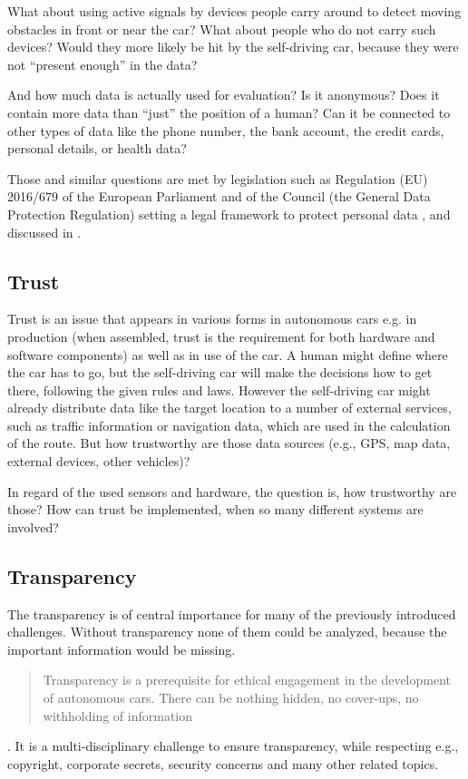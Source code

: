 What about using active signals by devices people carry around to detect moving obstacles in front or near the car? What about people who do not carry such devices? Would they more likely be hit by the self-driving car, because they were not \enquote{present enough} in the data?

And how much data is actually used for evaluation? Is it anonymous? Does it contain more data than \enquote{just} the position of a human? Can it be connected to other types of data like the phone number, the bank account, the credit cards, personal details, or health data?

Those and similar questions are met by legislation such as Regulation (EU) 2016/679 of the European Parliament and of the Council (the General Data Protection Regulation) setting a legal framework to protect personal data \cite{EuropeanUnion2016}, and discussed in \cite{doi:10.1093/idpl/ipx005}.


\subsection{Trust}
\label{sec:EAofTC:Trust}

Trust is an issue that appears in various forms in autonomous cars e.g. in production (when assembled, trust is the requirement for both hardware and software components) as well as in use of the car. A human might define where the car has to go, but the self-driving car will make the decisions how to get there, following the given rules and laws. However the self-driving car might already distribute data like the target location to a number of external services, such as traffic information or navigation data, which are used in the calculation of the route. But how trustworthy are those data sources (e.g., GPS, map data, external devices, other vehicles)? 

In regard of the used sensors and hardware, the question is, how trustworthy are those? How can trust be implemented, when so many different systems are involved? 


\subsection{Transparency}
\label{sec:EAofTC:Transparency}

The transparency is of central importance for many of the previously introduced challenges. Without transparency none of them could be analyzed, because the important information would be missing. \blockquote{Transparency is a prerequisite for ethical engagement in the development of autonomous cars. There can be nothing hidden, no cover-ups, no withholding of information} \cite{McBride:2016:EDC:2874239.2874265}. It is a multi-disciplinary challenge to ensure transparency, while respecting e.g., copyright, corporate secrets, security concerns and many other related topics. 

